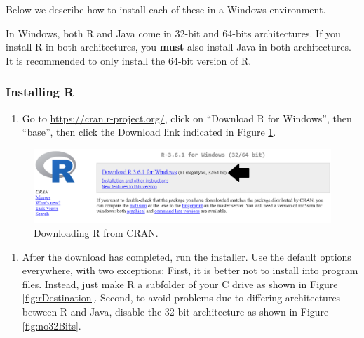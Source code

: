 \documentclass[11pt]{book}
\providecommand{\tightlist}{%
  \setlength{\itemsep}{0pt}\setlength{\parskip}{0pt}}
\theoremstyle{definition}
\theoremstyle{definition}
\theoremstyle{definition}
\theoremstyle{remark}
\let\BeginKnitrBlock\begin \let\EndKnitrBlock\end
\begin{document}
Below we describe how to install each of these in a Windows environment.

\BeginKnitrBlock{rmdimportant}
In Windows, both R and Java come in 32-bit and 64-bits architectures. If you install R in both architectures, you \textbf{must} also install Java in both architectures. It is recommended to only install the 64-bit version of R.
\EndKnitrBlock{rmdimportant}

\hypertarget{installing-r}{%
\subsubsection*{Installing R}\label{installing-r}}

\begin{enumerate}
\def\labelenumi{\arabic{enumi}.}
\tightlist
\item
  Go to \url{https://cran.r-project.org/}, click on ``Download R for Windows'', then ``base'', then click the Download link indicated in Figure \ref{fig:downloadR}.
\end{enumerate}

\begin{figure}

{\centering \includegraphics[width=1\linewidth]{images/OhdsiAnalyticsTools/downloadR} 

}

\caption{Downloading R from CRAN.}\label{fig:downloadR}
\end{figure}

\begin{enumerate}
\def\labelenumi{\arabic{enumi}.}
\setcounter{enumi}{1}
\tightlist
\item
  After the download has completed, run the installer. Use the default options everywhere, with two exceptions: First, it is better not to install into program files. Instead, just make R a subfolder of your C drive as shown in Figure \ref{fig:rDestination}. Second, to avoid problems due to differing architectures between R and Java, disable the 32-bit architecture as shown in Figure \ref{fig:no32Bits}.
\end{enumerate}
\end{document}
